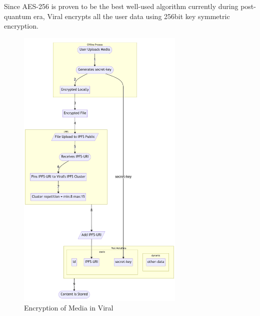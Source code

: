 \documentclass[10pt]{article}
\begin{document}
Since AES-256 is proven to be the best well-used algorithm currently during post-quantum era, Viral encrypts all the user data using 256bit key symmetric encryption. \\


\begin{figure}[H]
\begin{center}
\includegraphics[width=8cm]{encryption}
\caption{Encryption of Media in Viral}
\end{center}
\end{figure}
\end{document}
